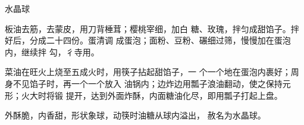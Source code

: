 \begin{recipe}{水晶球}

\ingredients


\cooking

\step 	板油去筋，去蒙皮，用刀背棰茸；樱桃宰细，加白 糖、玫瑰，拌匀成甜馅子。拌好后，分成二十四份。蛋清调 成蛋泡；面粉、豆粉、碾细过筛，慢慢加在蛋泡内，继续拌 勾，彳寺用。

\step 	菜油在旺火上烧至五成火时，用筷子拈起甜馅子，一 个一个地在蛋泡内裹好；周身不见馅子时，再一个一个放入 油锅内；边炸边用瓢子浪油翻动，使之保持元形；火大时将锻 提开，达到外面炸酥，内面糖油化尽，即用瓢子打起上盘。

\notes

外酥脆，内香甜，形状象球，动筷时油糖从球内溢出， 赦名为水晶球。

\end{recipe}

